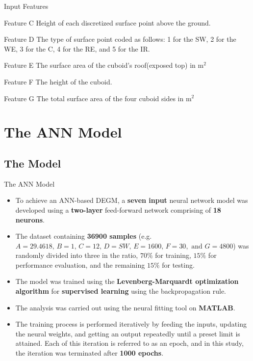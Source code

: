\documentclass{beamer}
\begin{document}
\begin{frame}{Input Features}
    \begin{block}{Feature C}
    \justifying
        Height of each discretized surface point above the ground.
    \end{block}
    \begin{block}{Feature D}
    \justifying
        The type of surface point coded as follows: 1 for the SW, 2 for the WE, 3 for the C, 4 for the RE, and 5 for the IR.
    \end{block}
    \begin{block}{Feature E}
    \justifying
        The surface area of the cuboid's roof(exposed top) in m$^2$
    \end{block}
    \begin{block}{Feature F}
    \justifying
        The height of the cuboid.
    \end{block}
    \begin{block}{Feature G}
    \justifying
        The total surface area of the four cuboid sides in m$^2$
    \end{block}
\end{frame}

\section{The ANN Model}
\subsection{The Model}
\begin{frame}{The ANN Model}
    \begin{itemize}
        \justifying
        \item To achieve an ANN-based DEGM, a \textbf{seven input} neural network model was developed using a \textbf{two-layer} feed-forward network comprising of \textbf{18 neurons}.
        \item The dataset containing \textbf{36900 samples} (e.g. $A = 29.4618,\, B=1,\, C= 12,\, D=SW,\, E = 1600,\, F = 30, \text{ and } G = 4800$) was randomly divided into three in the ratio, $70\%$ for training, $15\%$ for performance evaluation, and the remaining $15\%$ for testing.
        \item The model was trained using the \textbf{Levenberg-Marquardt optimization algorithm} for \textbf{supervised learning} using the backpropagation rule.
        \item The analysis was carried out using the neural fitting tool on \textbf{MATLAB}.
        \item The training process is performed iteratively by feeding the inputs, updating the neural weights, and getting an output repeatedly until a preset limit is attained. Each of this iteration is referred to as an epoch, and in this study, the iteration was terminated after \textbf{1000 epochs}.
    \end{itemize}
\end{frame}
\end{document}
